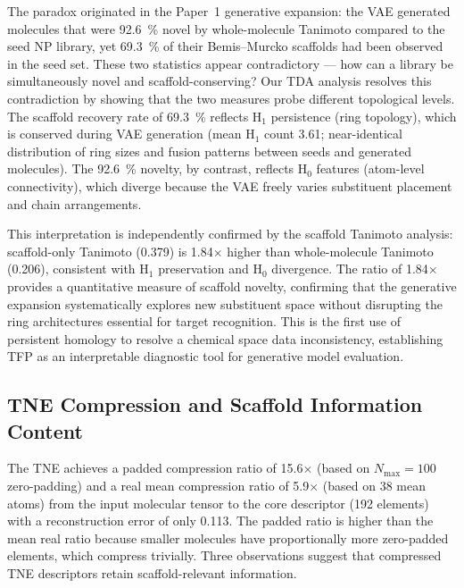 \documentclass[11pt,a4paper]{article}
\begin{document}
The paradox originated in the Paper~1 generative expansion: the VAE generated molecules that were \qty{92.6}{\percent} novel by whole-molecule Tanimoto compared to the seed NP library, yet \qty{69.3}{\percent} of their Bemis--Murcko scaffolds had been observed in the seed set. These two statistics appear contradictory --- how can a library be simultaneously novel and scaffold-conserving? Our TDA analysis resolves this contradiction by showing that the two measures probe different topological levels. The scaffold recovery rate of \qty{69.3}{\percent} reflects H$_1$ persistence (ring topology), which is conserved during VAE generation (mean H$_1$ count 3.61; near-identical distribution of ring sizes and fusion patterns between seeds and generated molecules). The \qty{92.6}{\percent} novelty, by contrast, reflects H$_0$ features (atom-level connectivity), which diverge because the VAE freely varies substituent placement and chain arrangements.

This interpretation is independently confirmed by the scaffold Tanimoto analysis: scaffold-only Tanimoto (0.379) is 1.84$\times$ higher than whole-molecule Tanimoto (0.206), consistent with H$_1$ preservation and H$_0$ divergence. The ratio of 1.84$\times$ provides a quantitative measure of scaffold novelty, confirming that the generative expansion systematically explores new substituent space without disrupting the ring architectures essential for target recognition. This is the first use of persistent homology to resolve a chemical space data inconsistency, establishing TFP as an interpretable diagnostic tool for generative model evaluation.

\subsection{TNE Compression and Scaffold Information Content}

The TNE achieves a padded compression ratio of \num{15.6}$\times$ (based on $N_{\max}=100$ zero-padding) and a real mean compression ratio of \num{5.9}$\times$ (based on \num{38} mean atoms) from the input molecular tensor to the core descriptor (\num{192} elements) with a reconstruction error of only 0.113. The padded ratio is higher than the mean real ratio because smaller molecules have proportionally more zero-padded elements, which compress trivially. Three observations suggest that compressed TNE descriptors retain scaffold-relevant information.
\end{document}
